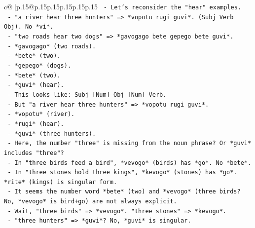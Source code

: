 \documentclass{article}
\begin{document}
{\begin{supertabular}{c@{$\;$}|p{.15\linewidth}@{}p{.15\linewidth}p{.15\linewidth}p{.15\linewidth}p{.15\linewidth}p{.15\linewidth}}
{{{\texttt{                               {-} Let's reconsider the "hear" examples.} \\
\texttt{                                 {-} "a river hear three hunters" => *vopotu rugi guvi*. (Subj Verb Obj). No *vi*.} \\
\texttt{                                 {-} "two roads hear two dogs" => *gavogago bete gepego bete guvi*.} \\
\texttt{                                   {-} *gavogago* (two roads).} \\
\texttt{                                   {-} *bete* (two).} \\
\texttt{                                   {-} *gepego* (dogs).} \\
\texttt{                                   {-} *bete* (two).} \\
\texttt{                                   {-} *guvi* (hear).} \\
\texttt{                                   {-} This looks like: Subj {[}Num{]} Obj {[}Num{]} Verb.} \\
\texttt{                                   {-} But "a river hear three hunters" => *vopotu rugi guvi*.} \\
\texttt{                                     {-} *vopotu* (river).} \\
\texttt{                                     {-} *rugi* (hear).} \\
\texttt{                                     {-} *guvi* (three hunters).} \\
\texttt{                                     {-} Here, the number "three" is missing from the noun phrase? Or *guvi* includes "three"?} \\
\texttt{                                     {-} In "three birds feed a bird", *vevogo* (birds) has *go*. No *bete*.} \\
\texttt{                                     {-} In "three stones hold three kings", *kevogo* (stones) has *go*. *rite* (kings) is singular form.} \\
\texttt{                                     {-} It seems the number word *bete* (two) and *vevogo* (three birds? No, *vevogo* is bird+go) are not always explicit.} \\
\texttt{                                     {-} Wait, "three birds" => *vevogo*. "three stones" => *kevogo*.} \\
\texttt{                                     {-} "three hunters" => *guvi*? No, *guvi* is singular.} \\
}}}
\end{supertabular}}
\end{document}

